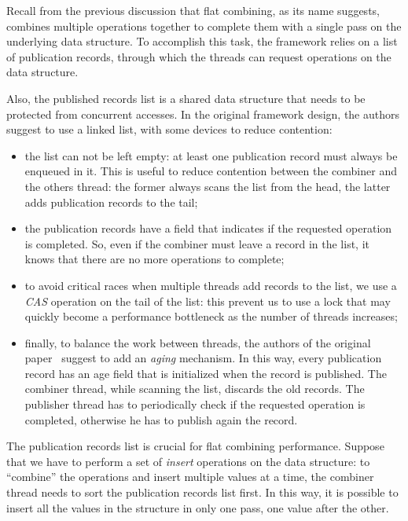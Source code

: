 Recall from the previous discussion that flat combining, as its name suggests,
combines multiple operations together to complete them with a single pass 
on the underlying data structure.
To accomplish this task, the framework relies on a list of publication records,
through which the threads can request operations on the data structure.

Also, the published records list is a shared data structure that needs
to be protected from concurrent accesses. In the original framework design,
the authors suggest to use a linked list, with some devices to reduce contention:

\begin{itemize}
\item the list can not be left empty: at least one publication record must 
always be enqueued in it. This is useful to reduce contention between the combiner
and the others thread: the former always scans the list from the head, the latter
adds publication records to the tail;
\item the publication records have a field that indicates if the requested operation 
is completed. So, even if the combiner must leave a record in the list, it knows 
that there are no more operations to complete;
\item to avoid critical races when multiple threads add records to the list, we
use a \emph{CAS} operation on the tail of the list: this prevent us to
use a lock that may quickly become a performance bottleneck as the number of
threads increases;
\item finally, to balance the work between threads, the authors of the original
paper~\cite{Hendler2010} suggest to add
an \emph{aging} mechanism. In this way, every publication record has an age
field that is initialized when the record is published. The combiner thread,
while scanning the list, discards the old records. The publisher thread has to
periodically check if the requested operation is completed, otherwise he has
to publish again the record. 
\end{itemize}

The publication records list is crucial for flat combining performance. Suppose
that we have to perform a set of \emph{insert} operations on the data structure:
to ``combine'' the operations and insert multiple values at a time, the combiner
thread needs to sort the publication records list first. In this way, it is
possible to insert all the values in the structure in only one pass, one value
after the other.

